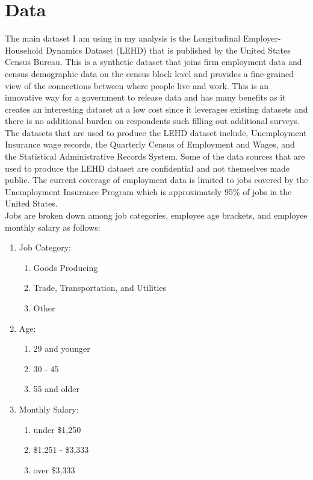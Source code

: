 \documentclass{article}
\theoremstyle{definition}
\theoremstyle{remark}
\begin{document}
\section{Data}
The main dataset I am using in my analysis is the Longitudinal Employer-Household Dynamics Dataset (LEHD) that is published by the United States Census Bureau.  This is a synthetic dataset that joins firm employment data and census demographic data on the census block level and provides a fine-grained view of the connections between where people live and work.  This is an innovative way for a government to release data and has many benefits as it creates an interesting dataset at a low cost since it leverages existing datasets and there is no additional burden on respondents such filling out additional surveys.  The datasets that are used to produce the LEHD dataset include, Unemployment Insurance wage records, the Quarterly Census of Employment and Wages, and the Statistical Administrative Records System.  Some of the data sources that are used to produce the LEHD dataset are confidential and not themselves made public.  The current coverage of employment data is limited to jobs covered by the Unemployment Insurance Program which is approximately 95\% of jobs in the United States.  \\

Jobs are broken down among job categories, employee age brackets, and employee monthly salary as follows:
\begin{enumerate}
\item Job Category:
    \begin{enumerate}
        \item Goods Producing
        \item Trade, Transportation, and Utilities
        \item Other
    \end{enumerate}
\item Age:
    \begin{enumerate}
        \item 29 and younger
        \item 30 - 45
        \item 55 and older
    \end{enumerate}
\item Monthly Salary:
    \begin{enumerate}
        \item under \$1,250
        \item \$1,251 - \$3,333
        \item over \$3,333
    \end{enumerate}
\end{enumerate}
\end{document}
